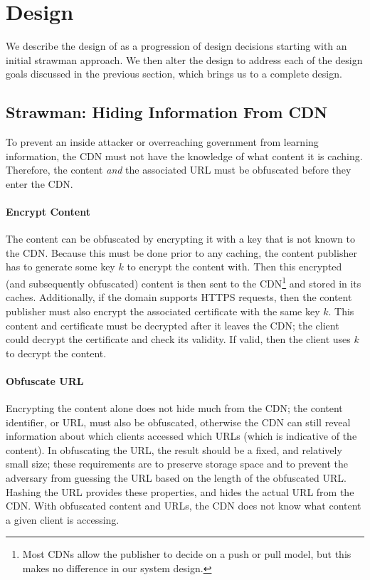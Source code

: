 \section{Design}
\label{sec:design}
We describe the design of \system{} as a progression of design decisions starting with an initial strawman approach.  We then 
alter the design to address each of the design goals discussed in the previous section, which brings us 
to a complete design.

\subsection{Strawman: Hiding Information From CDN}
\label{sec:obfuscate_content}
To prevent an inside attacker or overreaching government from learning information, the CDN 
must not have the knowledge of what content it is caching.  Therefore, the content {\it and} the 
associated URL must be obfuscated before they enter the CDN.  

\paragraph{Encrypt Content}  The content can be obfuscated by encrypting it with a key that is not 
known to the CDN.  Because this must be done prior to any caching, the content publisher 
has to generate some key $k$ to encrypt the content with.  Then this encrypted (and subsequently 
obfuscated) content is then sent to the CDN\footnote{Most CDNs
allow the publisher to decide on a push or pull model, but this makes no difference in our 
system design.} and stored in its caches.  
Additionally, if the domain supports HTTPS requests, then the content publisher must also encrypt the 
associated certificate with the same key $k$.  This content and certificate must be decrypted after 
it leaves the CDN; the client could decrypt the certificate and check its validity.  If valid, then 
the client uses $k$ to decrypt the content.  

\paragraph{Obfuscate URL} Encrypting the content alone does not hide much from the CDN; the content 
identifier, or URL, must also be obfuscated, otherwise the CDN can still reveal information about 
which clients accessed which URLs (which is indicative of the content).  In obfuscating the 
URL, the result should be a fixed, and relatively small size; these requirements are to preserve 
storage space and to prevent the adversary from guessing the URL based on the length of the obfuscated 
URL.  Hashing the URL provides these 
properties, and hides the actual URL from the CDN. With obfuscated content and 
URLs, the CDN does not know what content a given client is accessing.

